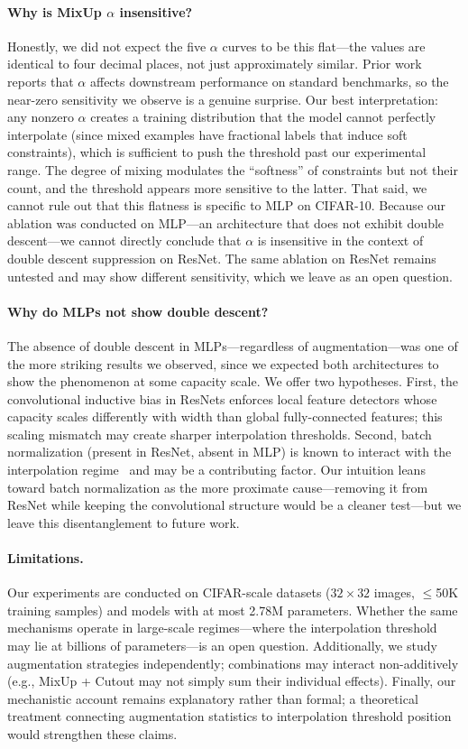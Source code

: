 \paragraph{Why is MixUp $\alpha$ insensitive?}
Honestly, we did not expect the five $\alpha$ curves to be this flat---the values are identical to four decimal places, not just approximately similar. Prior work~\cite{zhang2018mixup} reports that $\alpha$ affects downstream performance on standard benchmarks, so the near-zero sensitivity we observe is a genuine surprise. Our best interpretation: any nonzero $\alpha$ creates a training distribution that the model cannot perfectly interpolate (since mixed examples have fractional labels that induce soft constraints), which is sufficient to push the threshold past our experimental range. The degree of mixing modulates the ``softness'' of constraints but not their count, and the threshold appears more sensitive to the latter. That said, we cannot rule out that this flatness is specific to MLP on CIFAR-10. Because our ablation was conducted on MLP---an architecture that does not exhibit double descent---we cannot directly conclude that $\alpha$ is insensitive in the context of double descent suppression on ResNet. The same ablation on ResNet remains untested and may show different sensitivity, which we leave as an open question.

\paragraph{Why do MLPs not show double descent?}
The absence of double descent in MLPs---regardless of augmentation---was one of the more striking results we observed, since we expected both architectures to show the phenomenon at some capacity scale. We offer two hypotheses. First, the convolutional inductive bias in ResNets enforces local feature detectors whose capacity scales differently with width than global fully-connected features; this scaling mismatch may create sharper interpolation thresholds. Second, batch normalization (present in ResNet, absent in MLP) is known to interact with the interpolation regime~\cite{nakkiran2020deep} and may be a contributing factor. Our intuition leans toward batch normalization as the more proximate cause---removing it from ResNet while keeping the convolutional structure would be a cleaner test---but we leave this disentanglement to future work.

\paragraph{Limitations.}
Our experiments are conducted on CIFAR-scale datasets ($32{\times}32$ images, $\leq$50K training samples) and models with at most 2.78M parameters. Whether the same mechanisms operate in large-scale regimes---where the interpolation threshold may lie at billions of parameters---is an open question. Additionally, we study augmentation strategies independently; combinations may interact non-additively (e.g., MixUp + Cutout may not simply sum their individual effects). Finally, our mechanistic account remains explanatory rather than formal; a theoretical treatment connecting augmentation statistics to interpolation threshold position would strengthen these claims.

